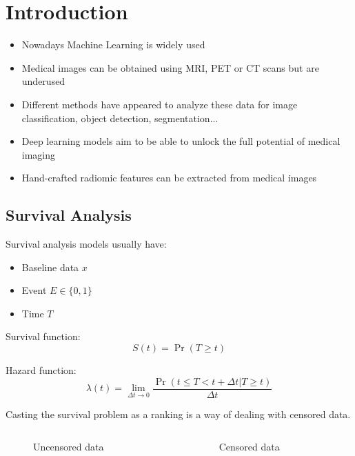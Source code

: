 
\section{Introduction}
\begin{frame}{\insertsec}
	\begin{itemize}
    \item Nowadays Machine Learning is widely used
    \item Medical images can be obtained using MRI, PET or CT scans but are underused
    \item Different methods have appeared to analyze these data for image classification,
    object detection, segmentation...
    \item Deep learning models aim to be able to unlock the full potential of medical imaging
    \item Hand-crafted radiomic features can be extracted from medical images
  \end{itemize}
\end{frame}

\subsection{Survival Analysis}
\begin{frame}{\insertsubsec}
  Survival analysis models usually have:
  \begin{itemize}
    \item Baseline data \( x \)
    \item Event \( E \in \{0, 1\} \)
    \item Time \( T \)
  \end{itemize}
  
  Survival function:
  \[
    S(t) = \Pr(T \ge t)
  \]

  Hazard function:
  \[
    \lambda(t) = \lim_{\Delta t \rightarrow 0}
    \frac{\Pr(t \le T < t + \Delta t | T \ge t)}{\Delta t}
  \]
\end{frame}

\begin{frame}

  Casting the survival problem as a ranking is a way of dealing with censored data.

  \begin{columns}
    \begin{column}{.5\textwidth}
      \begin{figure}
        \centering
        
        \caption{Uncensored data}
      \end{figure}
    \end{column}
    \begin{column}{.5\textwidth}
      \begin{figure}
        \centering
        
        \caption{Censored data}
      \end{figure}
    \end{column}
  \end{columns}
\end{frame}

